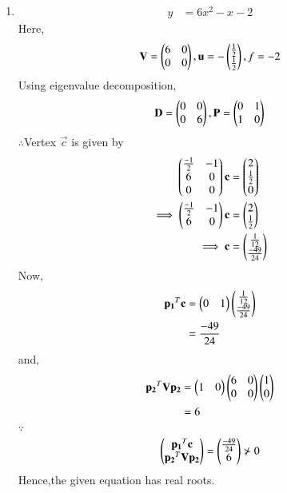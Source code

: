 \documentclass[journal,12pt,twocolumn]{IEEEtran}
\begin{document}
\begin{enumerate}
    \item
    \begin{align}
        y &= 6x^2-x-2
    \end{align}
    Here,
    \begin{align}
        \mathbf{V} = \begin{pmatrix}6 & 0 \\ 0 & 0\end{pmatrix},\mathbf{u}=-\begin{pmatrix}\frac{1}{2} \\ \frac{1}{2}\end{pmatrix},f=-2
    \end{align}
    Using eigenvalue decomposition,
    \begin{align}
        \mathbf{D} = \begin{pmatrix}0 & 0\\0 & 6\end{pmatrix} ,\mathbf{P}=\begin{pmatrix}0 & 1\\1 & 0\end{pmatrix}
    \end{align}
    $\therefore$Vertex $\vec{c}$ is given by
    \begin{align}
        \begin{pmatrix}\frac{-1}{2} & -1 \\ 6 & 0 \\ 0 & 0\end{pmatrix}\mathbf{c} &= \begin{pmatrix}2 \\ \frac{1}{2} \\ 0\end{pmatrix} \\
        \implies  \begin{pmatrix}\frac{-1}{2} & -1 \\ 6 & 0\end{pmatrix}\mathbf{c} &= \begin{pmatrix}2 \\ \frac{1}{2}\end{pmatrix}
        \\
        \implies \mathbf{c} &= \begin{pmatrix}\frac{1}{12} \\ \frac{-49}{24}\end{pmatrix}
    \end{align}
    Now,
    \begin{align}
        \mathbf{p_1}^T\mathbf{c} &= \begin{pmatrix}0 & 1\end{pmatrix}\begin{pmatrix}\frac{1}{12} \\ \frac{-49}{24}\end{pmatrix}
        \\
        &= \frac{-49}{24}
    \end{align}
    and,
    \begin{align}
        \mathbf{p_2}^T\mathbf{V}\mathbf{p_2} &= \begin{pmatrix}1 & 0\end{pmatrix}\begin{pmatrix}6 & 0\\0& 0\end{pmatrix}\begin{pmatrix}1 \\ 0\end{pmatrix}
        \\
        &= 6
    \end{align}
    $\because$
    \begin{align}
    \begin{pmatrix}\mathbf{p_1}^T\mathbf{c} \\ \mathbf{p_2}^T\mathbf{V}\mathbf{p_2}\end{pmatrix} = \begin{pmatrix}\frac{-49}{24} \\ 6\end{pmatrix} \nsucc 0
    \end{align}
    Hence,the given equation has real roots.
    

\end{enumerate}
\end{document}
